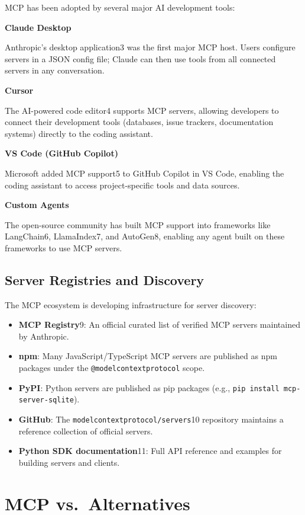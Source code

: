 MCP has been adopted by several major AI development tools:

\textbf{Claude Desktop}

Anthropic’s desktop application3 was the first major MCP host. Users configure servers in a JSON config file; Claude can then use tools from all connected servers in any conversation.

\textbf{Cursor}

The AI-powered code editor4 supports MCP servers, allowing developers to connect their development tools (databases, issue trackers, documentation systems) directly to the coding assistant.

\textbf{VS Code (GitHub Copilot)}

Microsoft added MCP support5 to GitHub Copilot in VS Code, enabling the coding assistant to access project-specific tools and data sources.

\textbf{Custom Agents}

The open-source community has built MCP support into frameworks like LangChain6, LlamaIndex7, and AutoGen8, enabling any agent built on these frameworks to use MCP servers.

\subsection{Server Registries and Discovery}
\label{server-registries-and-discovery}

The MCP ecosystem is developing infrastructure for server discovery:

\begin{itemize}
  \item \textbf{MCP Registry}9: An official curated list of verified MCP servers maintained by Anthropic.
  \item \textbf{npm}: Many JavaScript/TypeScript MCP servers are published as npm packages under the \texttt{@modelcontextprotocol} scope.
  \item \textbf{PyPI}: Python servers are published as pip packages (e.g., \texttt{pip install mcp-server-sqlite}).
  \item \textbf{GitHub}: The \texttt{modelcontextprotocol/servers}10 repository maintains a reference collection of official servers.
  \item \textbf{Python SDK documentation}11: Full API reference and examples for building servers and clients.
\end{itemize}

\section{MCP vs.~Alternatives}
\label{sec:mcp:alternatives}

